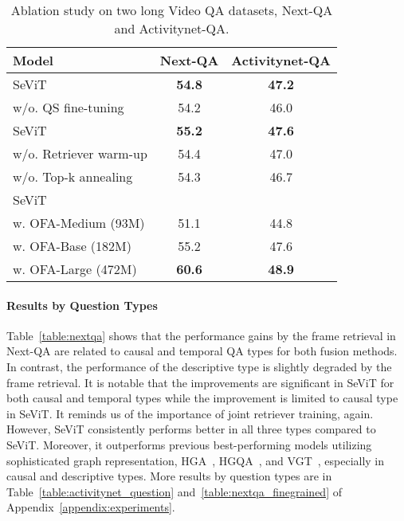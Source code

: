 \documentclass{article}
\newcommand{\frameworkname}{SeViT}
\begin{document}
\begin{table}[t!]
    \centering
    \small
    \caption{Ablation study on two long Video QA datasets, Next-QA and Activitynet-QA.}
    \vskip 0.15in
\begin{tabular}{lcc}
        \toprule
        Model & Next-QA & Activitynet-QA \\
        \midrule
        \frameworkname{} & \textbf{54.8} & \textbf{47.2} \\
        \quad w/o. QS fine-tuning & 54.2 & 46.0 \\
        \midrule
        \frameworkname{} & \textbf{55.2} & \textbf{47.6} \\
        \quad w/o. Retriever warm-up & 54.4 & 47.0 \\
        \quad w/o. Top-k annealing & 54.3 & 46.7 \\
        \midrule
        \frameworkname{} & &  \\
        \quad w. OFA-Medium \small{(93M)} & 51.1 & 44.8 \\
        \quad w. OFA-Base \small{(182M)} & 55.2 & 47.6 \\
        \quad w. OFA-Large \small{(472M)} & \textbf{60.6} & \textbf{48.9} \\
        
        \bottomrule
    \end{tabular}


    \label{table:ablation_study}
\end{table} 
\paragraph{Results by Question Types}


Table~\ref{table:nextqa} shows that the performance gains by the frame retrieval in Next-QA are related to causal and temporal QA types for both fusion methods. In contrast, the performance of the descriptive type is slightly degraded by the frame retrieval. It is notable that the improvements are significant in \frameworkname{} for both causal and temporal types while the improvement is limited to causal type in \frameworkname{}. It reminds us of the importance of joint retriever training, again. However, \frameworkname{} consistently performs better in all three types compared to \frameworkname{}. Moreover, it outperforms previous best-performing models utilizing sophisticated graph representation, HGA~\cite{jiang2020reasoning}, HGQA~\cite{xiao2022video}, and VGT~\cite{xiao2022videotransformer}, especially in causal and descriptive types. More results by question types are in Table~\ref{table:activitynet_question} and~\ref{table:nextqa_finegrained} of Appendix~\ref{appendix:experiments}.
\end{document}
